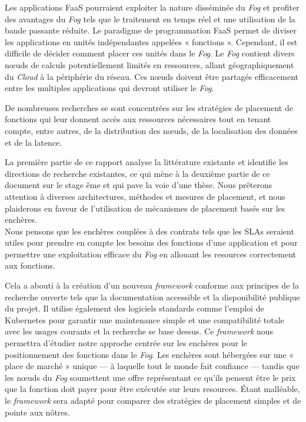 Les applications \gls{FaaS} pourraient exploiter la nature disséminée du \emph{Fog} et profiter des avantages du \emph{Fog} tels que le traitement en temps réel et une utilisation de la bande passante réduite. Le paradigme de programmation \gls{FaaS} permet de diviser les applications en unités indépendantes appelées « fonctions ». Cependant, il est difficile de décider comment placer ces unités dans le \emph{Fog}. Le \emph{Fog} contient divers nœuds de calculs potentiellement limités en ressources, allant géographiquement du \emph{Cloud} à la périphérie du réseau. Ces nœuds doivent être partagés efficacement entre les multiples applications qui devront utiliser le \emph{Fog}.

De nombreuses recherches se sont concentrées sur les stratégies de placement de fonctions qui leur donnent accès aux ressources nécessaires tout en tenant compte, entre autres, de la distribution des nœuds, de la localisation des données et de la latence.

La première partie de ce rapport analyse la littérature existante et identifie les directions de recherche existantes, ce qui mène à la deuxième partie de ce document sur le stage ême et qui pave la voie d'une thèse. Nous prêterons attention à diverses architectures, méthodes et mesures de placement, et nous plaiderons en faveur de l'utilisation de mécanismes de placement basés sur les enchères.\\
Nous pensons que les enchères couplées à des contrats tels que les \glspl{SLA} seraient utiles pour prendre en compte les besoins des fonctions d'une application et pour permettre une exploitation efficace du \emph{Fog} en allouant les resources correctement aux fonctions.

Cela a abouti à la création d'un nouveau \emph{framework} conforme aux principes de la recherche ouverte tels que la documentation accessible et la disponibilité publique du projet. Il utilise également des logiciels standards comme l'emploi de Kubernetes pour garantir une maintenance simple et une compatibilité totale avec les usages courants et la recherche se base dessus. Ce \emph{framework} nous permettra d'étudier notre approche centrée sur les enchères pour le positionnement des fonctions dans le \emph{Fog}. Les enchères sont hébergées sur une « place de marché » unique — à laquelle tout le monde fait confiance — tandis que les nœuds du \emph{Fog} soumettent une offre représentant ce qu'ils pensent être le prix que la fonction doit payer pour être exécutée sur leurs resources. Étant malléable, le \emph{framework} sera adapté pour comparer des stratégies de placement simples et de pointe aux nôtres.


